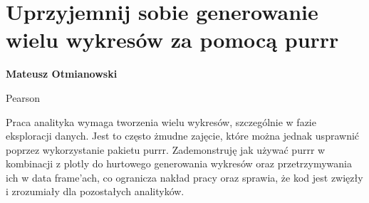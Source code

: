 \documentclass[\main/boa.tex]{subfiles}
\begin{document}
\section{Uprzyjemnij sobie generowanie wielu wykresów za pomocą purrr}

\begin{minipage}{0.915\textwidth}
	\centering
  {\bf {}  Mateusz Otmianowski}
\end{minipage}

\vskip 0.3cm

\begin{affiliations}
\begin{minipage}{0.915\textwidth}
\centering
Pearson \\[-2pt]
\end{minipage}
\end{affiliations}

\vskip 0.8cm

Praca analityka wymaga tworzenia wielu wykresów, szczególnie w fazie eksploracji danych. Jest to często żmudne zajęcie, które można jednak usprawnić poprzez wykorzystanie pakietu purrr. Zademonstruję jak używać purrr w kombinacji z plotly do hurtowego generowania wykresów oraz przetrzymywania ich w data frame’ach, co ogranicza nakład pracy oraz sprawia, że kod jest zwięzły i zrozumiały dla pozostałych analityków. 
\end{document}
